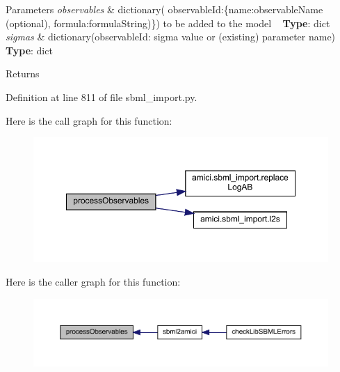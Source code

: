 \begin{DoxyParams}{Parameters}
{\em observables} & dictionary( observable\+Id\+:\{\textquotesingle{}name\textquotesingle{}\+:observable\+Name (optional), \textquotesingle{}formula\textquotesingle{}\+:formula\+String)\}) to be added to the model ~\newline
{\bfseries Type}\+: dict\\
\hline
{\em sigmas} & dictionary(observable\+Id\+: sigma value or (existing) parameter name) ~\newline
{\bfseries Type}\+: dict\\
\hline
\end{DoxyParams}
\begin{DoxyReturn}{Returns}

\end{DoxyReturn}


Definition at line 811 of file sbml\+\_\+import.\+py.

Here is the call graph for this function\+:
\nopagebreak
\begin{figure}[H]
\begin{center}
\leavevmode
\includegraphics[width=350pt]{classamici_1_1sbml__import_1_1_sbml_importer_a903b87aa6c483832424fa2cc76adc4d5_cgraph}
\end{center}
\end{figure}
Here is the caller graph for this function\+:
\nopagebreak
\begin{figure}[H]
\begin{center}
\leavevmode
\includegraphics[width=350pt]{classamici_1_1sbml__import_1_1_sbml_importer_a903b87aa6c483832424fa2cc76adc4d5_icgraph}
\end{center}
\end{figure}
\mbox{\label{classamici_1_1sbml__import_1_1_sbml_importer_a1579faf8b188de11ed58ddbebc3c20a7}} 

